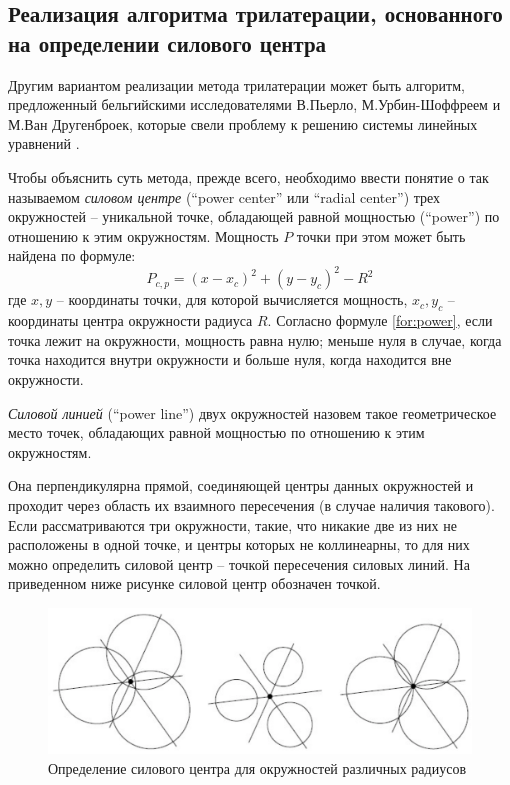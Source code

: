 \subsection{Реализация алгоритма трилатерации, основанного на определении силового центра}

Другим вариантом реализации метода трилатерации может быть алгоритм, предложенный бельгийскими исследователями В.Пьерло, М.Ур\-бин-Шоф\-фреем и М.Ван Другенброек, которые свели проблему к решению системы линейных уравнений \cite{pierlot2011new}.

Чтобы объяснить суть метода, прежде всего, необходимо ввести понятие о так называемом \textit{силовом центре} (“power center” или “radial center”) трех окружностей – уникальной точке, обладающей равной мощностью (“power”) по отношению к этим окружностям. Мощность $P$ точки при этом может быть найдена по формуле:
\begin{equation} \label{for:power}
    P_{c,p} = (x-x_c)^2 + (y-y_c)^2 - R^2
\end{equation}
где ${x, y}$ – координаты точки, для которой вычисляется мощность, ${x_c, y_c}$ – координаты центра окружности радиуса $R$. Согласно формуле \ref{for:power}, если точка лежит на окружности, мощность равна нулю; меньше нуля в случае, когда точка находится внутри окружности и больше нуля, когда находится вне окружности.

\textit{Силовой линией }(“power line”) двух окружностей назовем такое геометрическое место точек, обладающих равной мощностью по отношению к этим окружностям. 

Она перпендикулярна прямой, соединяющей центры данных окружностей и проходит через область их взаимного пересечения (в случае наличия такового). Если рассматриваются три окружности, такие, что никакие две из них не расположены в одной точке, и центры которых не коллинеарны, то для них можно определить силовой центр – точкой пересечения силовых линий. На приведенном ниже рисунке силовой центр обозначен точкой.

\begin{figure}[ht]
    \centering
    \includegraphics[width=\textwidth]{img/powerCenters}
    \caption{Определение силового центра для окружностей различных радиусов}
\end{figure}

